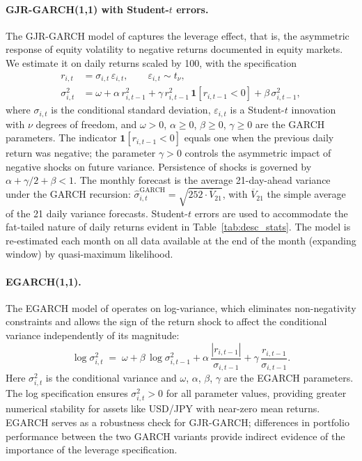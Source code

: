 \documentclass[12pt, a4paper]{article}
\newcommand{\shat}{\hat{\sigma}}
\begin{document}
\paragraph{GJR-GARCH(1,1) with Student-$t$ errors.}
The GJR-GARCH model of \citet{Glosten1993} captures the leverage effect, that is, the
asymmetric response of equity volatility to negative returns documented in equity markets.
We estimate it on daily returns scaled by 100, with the specification
\begin{align}
  r_{i,t} &= \sigma_{i,t}\,\varepsilon_{i,t},
  \qquad \varepsilon_{i,t} \sim t_\nu, \\
  \sigma_{i,t}^2 &= \omega + \alpha\, r_{i,t-1}^2
                   + \gamma\, r_{i,t-1}^2\,\mathbf{1}[r_{i,t-1}<0]
                   + \beta\,\sigma_{i,t-1}^2,
\end{align}
where $\sigma_{i,t}$ is the conditional standard deviation, $\varepsilon_{i,t}$ is a
Student-$t$ innovation with $\nu$ degrees of freedom, and $\omega > 0$, $\alpha \geq 0$,
$\beta \geq 0$, $\gamma \geq 0$ are the GARCH parameters. The indicator
$\mathbf{1}[r_{i,t-1}<0]$ equals one when the previous daily return was negative; the
parameter $\gamma > 0$ controls the asymmetric impact of negative shocks on future
variance. Persistence of shocks is governed by $\alpha + \gamma/2 + \beta < 1$. The
monthly forecast is the average 21-day-ahead variance under the GARCH recursion:
$\shat^{\mathrm{GARCH}}_{i,t} = \sqrt{252 \cdot \overline{V}_{21}}$, with $\overline{V}_{21}$
the simple average of the 21 daily variance forecasts. Student-$t$ errors are used to
accommodate the fat-tailed nature of daily returns evident in
Table~\ref{tab:desc_stats}. The model is re-estimated each month on all data available at
the end of the month (expanding window) by quasi-maximum likelihood.

\paragraph{EGARCH(1,1).}
The EGARCH model of \citet{Nelson1991} operates on log-variance, which eliminates
non-negativity constraints and allows the sign of the return shock to affect the
conditional variance independently of its magnitude:
\begin{equation}
  \log\sigma_{i,t}^2 \;=\; \omega + \beta\,\log\sigma_{i,t-1}^2
                            + \alpha\,\frac{|r_{i,t-1}|}{\sigma_{i,t-1}}
                            + \gamma\,\frac{r_{i,t-1}}{\sigma_{i,t-1}}.
\end{equation}
Here $\sigma_{i,t}^2$ is the conditional variance and $\omega$, $\alpha$, $\beta$,
$\gamma$ are the EGARCH parameters. The log specification ensures $\sigma_{i,t}^2 > 0$
for all parameter values, providing greater numerical stability for assets like USD/JPY
with near-zero mean returns. EGARCH serves as a robustness check for GJR-GARCH;
differences in portfolio performance between the two GARCH variants provide indirect
evidence of the importance of the leverage specification.
\end{document}
